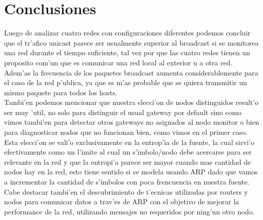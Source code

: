 \section{Conclusiones}
Luego de analizar cuatro redes con configuraciones diferentes podemos concluir que el tr'afico unicast parece 
ser usualmente superior al broadcast si se monitorea una red durante el tiempo suficiente, tal vez por que las cuatro redes tienen un proposito
com'un que es comunicar una red local al exterior u a otra red. Adem'as la frecuencia de los paquetes broadcast aumenta considerablemente
 para el caso de la red p'ublica, ya que es m'as probable que se quiera transmitir un mismo paquete para todos los hosts. \\
 
 Tambi'en podemos mencionar que nuestra elecci'on de nodos distinguidos result'o
ser muy 'util, no solo para distinguir el usual gateway por default sino como vimos tambi'en para detectar otros gateways no asignados al
nodo monitor o bien para diagnosticar nodos que no funcionan bien, como vimos en el primer caso. Esta elecci'on se vali'o exclusivamente en la
entrop'ia de la fuente, la cual sirvi'o efectivamente como un l'imite al cual un s'imbolo/nodo debe acercarse para ser relevante en la red y que la
entropi'a parece ser mayor cuando mas cantidad de nodos hay en la red, esto tiene sentido si se modela usando ARP dado que vamos a incrementar
la cantidad de s'imbolos con poca frencuencia en nuestra fuente. \\

Cabe destacar tambi'en el descubrimiento de t'ecnicas utilizadas por routers y nodos para comunicar datos a trav'es de ARP con el objetivo
de mejorar la performance de la red, utilizando mensajes no requeridos por ning'un otro nodo.



